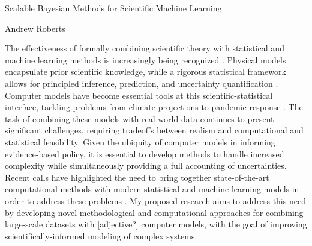 \documentclass[12pt]{article}
\begin{document}
\begin{center}
Scalable Bayesian Methods for Scientific Machine Learning
\end{center}

\begin{flushright}
Andrew Roberts
\end{flushright} 

The effectiveness of formally combining scientific theory with statistical and machine learning methods is increasingly being recognized \cite{Willcox, Laubmeier, Wikle}. 
Physical models encapsulate prior scientific knowledge, while a rigorous statistical framework allows for principled inference, prediction, and uncertainty quantification \cite{Clark}. Computer models have become essential tools at this scientific-statistical interface, tackling problems from 
climate projections \cite{Canadell} to pandemic response \cite{Swallow}. The task of combining these models with real-world data continues to present
significant challenges, requiring tradeoffs between realism and computational and statistical feasibility. Given the ubiquity of computer models in informing
 evidence-based policy, it is essential to develop methods to handle increased complexity while simultaneously providing a full accounting of uncertainties.
Recent calls have highlighted the need to bring together state-of-the-art computational methods with modern statistical 
and machine learning models in order to address these problems \cite{Wikle, Baker}. My proposed research aims to address this need by developing novel methodological and computational approaches for combining large-scale datasets with [adjective?] computer models, with the goal of improving scientifically-informed modeling of complex systems. 
\end{document}
